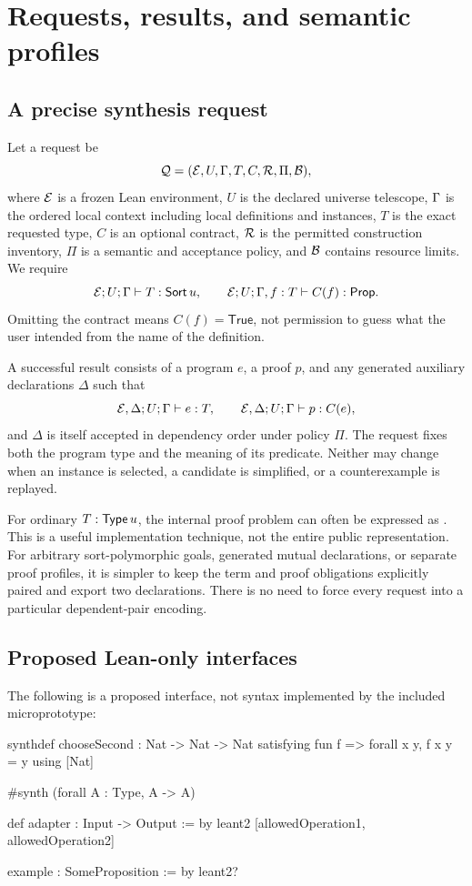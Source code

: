 \section{Requests, results, and semantic profiles}\label{sec:requests}

\subsection{A precise synthesis request}

Let a request be
\[
 \mathcal Q=(\mathcal E,U,\Gamma,T,C,\mathcal R,\Pi,\mathcal B),
\]
where $\mathcal E$ is a frozen Lean environment, $U$ is the declared universe telescope,
$\Gamma$ is the ordered local context including local definitions and instances,
$T$ is the exact requested type, $C$ is an optional contract, $\mathcal R$ is the
permitted construction inventory, $\Pi$ is a semantic and acceptance policy,
and $\mathcal B$ contains resource limits. We require
\[
 \mathcal E;U;\Gamma\vdash T:\mathsf{Sort}\,u,
 \qquad
 \mathcal E;U;\Gamma,f:T\vdash C(f):\mathsf{Prop}.
\]
Omitting the contract means $C(f)=\mathsf{True}$, not permission to guess what
the user intended from the name of the definition.

A successful result consists of a program $e$, a proof $p$, and any generated
auxiliary declarations $\Delta$ such that
\begin{equation}\label{eq:acceptance}
 \mathcal E,\Delta;U;\Gamma\vdash e:T,
 \qquad
 \mathcal E,\Delta;U;\Gamma\vdash p:C(e),
\end{equation}
and $\Delta$ is itself accepted in dependency order under policy $\Pi$. The
request fixes both the program type and the meaning of its predicate. Neither
may change when an instance is selected, a candidate is simplified, or a
counterexample is replayed.

For ordinary $T:\mathsf{Type}\,u$, the internal proof problem can often be expressed as
. This is a useful implementation technique, not the
entire public representation. For arbitrary sort-polymorphic goals, generated
mutual declarations, or separate proof profiles, it is simpler to keep the term
and proof obligations explicitly paired and export two declarations. There is
no need to force every request into a particular dependent-pair encoding.

\subsection{Proposed Lean-only interfaces}

The following is a proposed interface, not syntax implemented by the included
microprototype:
\begin{Code}
synthdef chooseSecond : Nat -> Nat -> Nat
  satisfying fun f => forall x y, f x y = y
  using [Nat]

#synth (forall A : Type, A -> A)

def adapter : Input -> Output := by
  leant2 [allowedOperation1, allowedOperation2]

example : SomeProposition := by
  leant2?
\end{Code}

